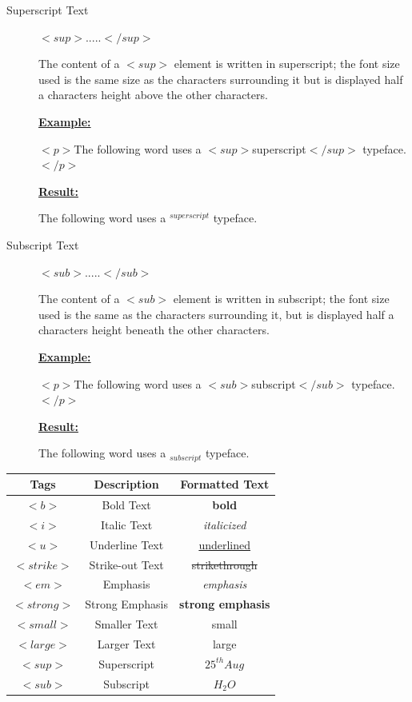 \documentclass[11pt,a4paper]{article}
\begin{document}
\begin{description}
\item[Superscript Text]$<sup>.....</sup>$

\hspace{1cm} The content of a $<sup>$ element is written in superscript; the font size used is the same size as the characters surrounding it but is displayed half a characters height above the other characters.\

\underline{\textbf{Example:}}

\hspace{1cm}$<p>$The following word uses a $<sup>$superscript$</sup>$ typeface.$</p>$

\underline{\textbf{Result:}}

\hspace{1cm}The following word uses a $^{superscript}$ typeface.\

\item[Subscript Text] $<sub>.....</sub>$

\hspace{1cm}The content of a $<sub>$ element is written in subscript; the font size used is the same as the characters surrounding it, but is displayed half a characters height beneath the other characters.\

\underline{\textbf{Example:}}

\hspace{1cm}$<p>$The following word uses a $<sub>$subscript$</sub>$ typeface.$</p>$

\underline{\textbf{Result:}}

\hspace{1cm}The following word uses a $_{subscript}$ typeface.
\end{description}

\begin{center}
\begin{tabular}{| c | c | c |}\hline
\textbf{Tags} & \textbf{Description} & \textbf{Formatted Text} \\ \hline
$<b>$ & Bold Text & \textbf{bold} \\ \hline
$<i>$ & Italic Text & \textit{italicized}\\ \hline
$<u>$ & Underline Text & \underline{underlined} \\ \hline
$<strike>$ & Strike-out Text & \st{strikethrough}\\ \hline
$<em>$ & Emphasis & \emph{emphasis}\\ \hline
$<strong>$ & Strong Emphasis & \textbf{strong emphasis}\\ \hline
$<small>$ & Smaller Text & \small{small}\\ \hline
$<large>$ & Larger Text & {\large{large}}\\ \hline
$<sup>$ & Superscript & $25^{th} Aug$\\ \hline
$<sub>$ & Subscript & $H_{2}O$\\ \hline
\end{tabular}
\end{center}
\end{document}
